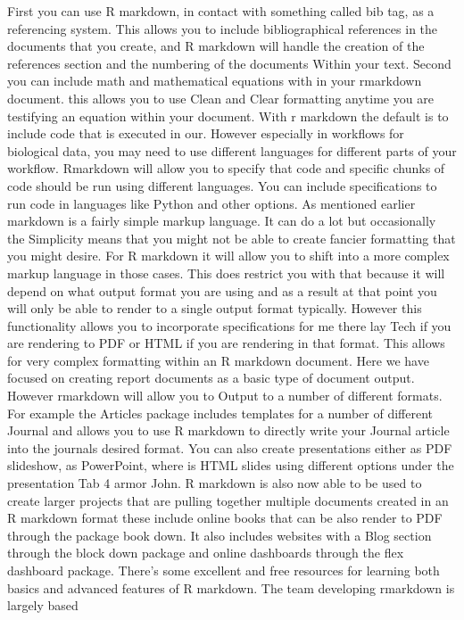 \documentclass[]{tufte-book}
\begin{document}
First you can use R markdown, in contact with something called bib
tag, as a referencing system. This allows you to include bibliographical
references in the documents that you create, and R markdown will handle the
creation of the references section and the numbering of the documents Within
your text. Second you can include math and mathematical equations with in your
rmarkdown document. this allows you to use Clean and Clear formatting anytime
you are testifying an equation within your document. With r markdown the default
is to include code that is executed in our. However especially in workflows for
biological data, you may need to use different languages for different parts of
your workflow. Rmarkdown will allow you to specify that code and specific chunks
of code should be run using different languages. You can include specifications
to run code in languages like Python and other options. As mentioned earlier
markdown is a fairly simple markup language. It can do a lot but occasionally
the Simplicity means that you might not be able to create fancier formatting
that you might desire. For R markdown it will allow you to shift into a more
complex markup language in those cases. This does restrict you with that because
it will depend on what output format you are using and as a result at that point
you will only be able to render to a single output format typically. However
this functionality allows you to incorporate specifications for me there lay
Tech if you are rendering to PDF or HTML if you are rendering in that format.
This allows for very complex formatting within an R markdown document. Here we
have focused on creating report documents as a basic type of document output.
However rmarkdown will allow you to Output to a number of different formats. For
example the Articles package includes templates for a number of different
Journal and allows you to use R markdown to directly write your Journal article
into the journals desired format. You can also create presentations either as
PDF slideshow, as PowerPoint, where is HTML slides using different options under
the presentation Tab 4 armor John. R markdown is also now able to be used to
create larger projects that are pulling together multiple documents created in
an R markdown format these include online books that can be also render to PDF
through the package book down. It also includes websites with a Blog section
through the block down package and online dashboards through the flex dashboard
package. There's some excellent and free resources for learning both basics and
advanced features of R markdown. The team developing rmarkdown is largely based
\end{document}
